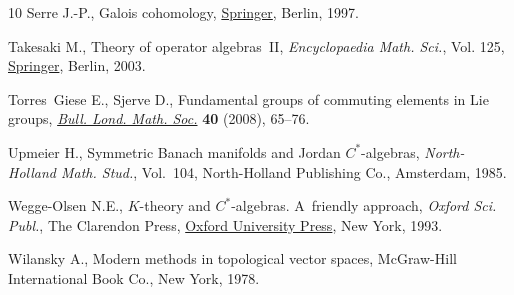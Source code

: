 \documentclass[10pt,a4paper]{amsart}
\numberwithin{equation}{section}
\begin{document}
\begin{thebibliography}{10}
Serre J.-P., Galois cohomology, \href{https://doi.org/10.1007/978-3-642-59141-9}{Springer}, Berlin, 1997.

Takesaki M., Theory of operator algebras~{II}, \textit{Encyclopaedia Math.
 Sci.}, Vol. 125, \href{https://doi.org/10.1007/978-3-662-10451-4}{Springer}, Berlin, 2003.

Torres~Giese E., Sjerve D., Fundamental groups of commuting elements in {L}ie
 groups, \href{https://doi.org/10.1112/blms/bdm094}{\textit{Bull. Lond. Math. Soc.}} \textbf{40} (2008), 65--76.

Upmeier H., Symmetric {B}anach manifolds and {J}ordan {$C^\ast$}-algebras,
 \textit{North-Holland Math. Stud.}, Vol.~104, North-Holland Publishing Co.,
 Amsterdam, 1985.

Wegge-Olsen N.E., {$K$}-theory and {$C^*$}-algebras. {A}~friendly approach,
 \textit{Oxford Sci. Publ.}, The Clarendon Press, \href{https://doi.org/10.1093/oso/9780198596943.001.0001}{Oxford University Press}, New York,
 1993.

Wilansky A., Modern methods in topological vector spaces, McGraw-Hill
 International Book Co., New York, 1978.

\end{thebibliography}
\end{document}
